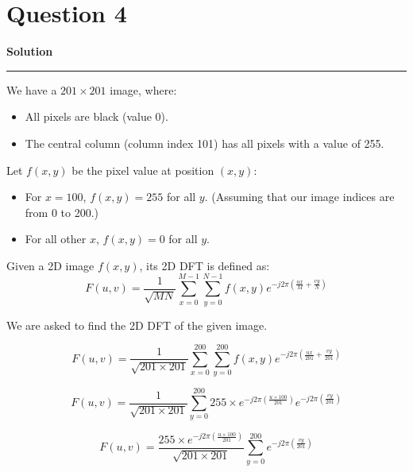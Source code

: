 \documentclass[a4paper,12pt]{article}
\title{\cooltitle{CS663 Assignment-3}}
\author{{\bf Saksham Rathi, Kavya Gupta, Shravan Srinivasa Raghavan} \\
\small Department of Computer Science, \\
Indian Institute of Technology Bombay \\}
\date{}
\newenvironment{solution}[2][]{%
    \begin{mdframed}[linecolor=green!60!black, linewidth=2pt, roundcorner=10pt, backgroundcolor=green!5!white, skipabove=12pt, skipbelow=12pt]%
        \textbf{\large #2} %
        \par\noindent\rule{\textwidth}{0.4pt} %
        \vspace{0.5em} %
}{%
    \end{mdframed}%
}
\begin{document}
\maketitle
\section*{Question 4}

\begin{solution}{Solution}
    We have a $201\times 201$ image, where:
\begin{itemize}
    \item All pixels are black (value 0).
    \item The central column (column index 101) has all pixels with a value of 255.
\end{itemize}

Let $f(x, y)$ be the pixel value at position $(x, y)$:
\begin{itemize}
    \item For $x = 100$, $f(x, y) = 255$ for all $y$. (Assuming that our image indices are from 0 to 200.)
    \item For all other $x$, $f(x, y) = 0$ for all $y$.
\end{itemize}

Given a 2D image $f(x, y)$, its 2D DFT is defined as:
\begin{equation}
    F(u, v) = \frac{1}{\sqrt{MN}}\sum_{x=0}^{M-1} \sum_{y=0}^{N-1} f(x, y) e^{-j2\pi\left(\frac{ux}{M} + \frac{vy}{N}\right)}
\end{equation}

We are asked to find the 2D DFT of the given image.

\begin{equation}
    F(u, v) = \frac{1}{\sqrt{201\times 201}}\sum_{x=0}^{200} \sum_{y=0}^{200} f(x, y) e^{-j2\pi\left(\frac{ux}{201} + \frac{vy}{201}\right)}
\end{equation}

\begin{equation}
    F(u, v) = \frac{1}{\sqrt{201\times 201}} \sum_{y=0}^{200} 255\times e^{-j2\pi\left(\frac{u\times 100}{201}\right)} e^{-j2\pi\left(\frac{vy}{201}\right)}
\end{equation}

\begin{equation}
    F(u, v) = \frac{255\times e^{-j2\pi\left(\frac{u\times 100}{201}\right)}}{\sqrt{201\times 201}} \sum_{y=0}^{200} e^{-j2\pi\left(\frac{vy}{201}\right)}
\end{equation}


\end{solution}
\end{document}
